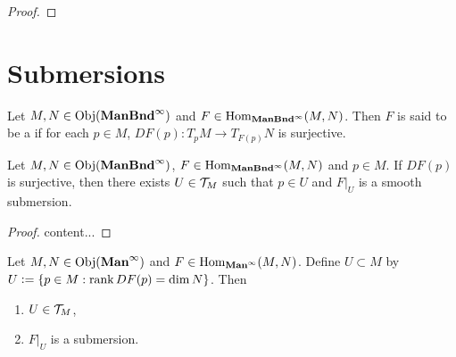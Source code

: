 \documentclass{book}
\begin{document}
\begin{proof}
\end{proof}

\begin{ex}
\end{ex}





































	\newpage
	\section{Submersions}
	
	
	\begin{defn} 
		Let $M, N \in \operatorname{Obj}(\operatorname*{\text{\textbf{ManBnd}}^{\infty}})$ and $F \in \operatorname{Hom}_{\operatorname*{\text{\textbf{ManBnd}}^{\infty}}}(M,N)$. Then $F$ is said to be a  if for each $p \in M$, $DF(p) :T_pM\rightarrow T_{F(p)}N$ is surjective.
	\end{defn}

	\begin{ex} 
		Let $M, N \in \operatorname{Obj}(\operatorname*{\text{\textbf{ManBnd}}^{\infty}})$, $F \in \operatorname{Hom}_{\operatorname*{\text{\textbf{ManBnd}}^{\infty}}}(M, N)$ and $p \in M$. If $DF(p)$ is surjective, then there exists $U \in \mathcal{T}_M$ such that $p \in U$ and $F|_U$ is a smooth submersion.
	\end{ex}
	
	\begin{proof}
		content...
	\end{proof}
	
	\begin{ex} 
		Let $M, N \in \operatorname{Obj}(\operatorname*{\text{\textbf{Man}}^{\infty}})$ and $F \in \operatorname{Hom}_{\operatorname*{\text{\textbf{Man}}^{\infty}}}(M,N)$. Define $U \subset M$ by $U \vcentcolon= \{p \in M: \operatorname{\text{rank}} DF(p) = \dim N\}$. Then 
		\begin{enumerate}
			\item $U \in \mathcal{T}_M$,
			\item $F|_U$ is a submersion.
		\end{enumerate}
	\end{ex}
	
\end{document}
